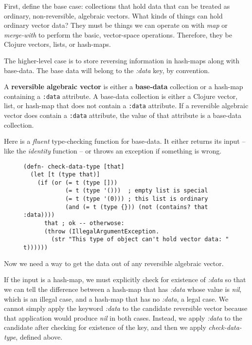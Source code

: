 \documentclass[11pt]{article}
\begin{document}
First, define the base case: collections that hold data that can be
treated as ordinary, non-reversible, algebraic vectors.  What kinds of
things can hold ordinary vector data?  They must be things we can
operate on with \emph{map} or \emph{merge-with} to perform the basic, vector-space
operations.  Therefore, they be Clojure vectors, lists, or hash-maps.

The higher-level case is to store reversing information in hash-maps
along with base-data. The base data will belong to the \emph{:data} key, by
convention.


\begin{mydefinition}
A \textbf{reversible algebraic vector} is either a \textbf{base-data}
collection or a hash-map containing a \texttt{:data} attribute. A
base-data collection is either a Clojure vector, list, or hash-map that
does not contain a \texttt{:data} attribute. If a reversible algebraic
vector does contain a \texttt{:data} attribute, the value of that
attribute is a base-data collection.  \end{mydefinition}

Here is a \emph{fluent} type-checking function for base-data. It either
returns its input -- like the \emph{identity} function -- or throws an
exception if something is wrong.

\begin{figure}[H]
\label{check-data-type}
\begin{verbatim}
(defn- check-data-type [that]
  (let [t (type that)]
    (if (or (= t (type []))
            (= t (type '()))  ; empty list is special
            (= t (type '(0))) ; this list is ordinary
            (and (= t (type {})) (not (contains? that :data))))
      that ; ok -- otherwose:
      (throw (IllegalArgumentException.
        (str "This type of object can't hold vector data: " t))))))
\end{verbatim}
\end{figure}

Now we need a way to get the data out of any reversible algebraic
vector.

If the input is a hash-map, we must explicitly check for existence of
\emph{:data} so that we can tell the difference between a hash-map that has
\emph{:data} whose value is \emph{nil}, which is an illegal case, and a hash-map
that has no \emph{:data}, a legal case. We cannot simply apply the keyword
\emph{:data} to the candidate reversible vector because that application
would produce \emph{nil} in both cases. Instead, we apply \emph{:data} to the
candidate after checking for existence of the key, and then we apply
\emph{check-data-type}, defined above.
\end{document}
